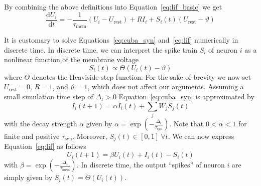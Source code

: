 \documentclass[journal,onecolumn,11pt]{IEEEtran}
\begin{document}
By combining the above definitions into Equation~\eqref{eq:lif_basic} we get 
\begin{equation} 
    \frac{\mathrm{d}U_i}{\mathrm{d}t} = -\frac{1}{\tau_\mathrm{mem}}(U_i-U_\mathrm{rest}) + RI_i + S_i(t)(U_\mathrm{rest}-\vartheta)
    \label{eq:lif}
\end{equation}

It is customary to solve Equations~\eqref{eq:cuba_syn} and~\eqref{eq:lif}
numerically in discrete time.  In discrete time, we can interpret the spike
train $S_i$ of neuron $i$ as a nonlinear function of the membrane voltage
\begin{equation}
    S_i(t)\propto\Theta(U_i(t)-\vartheta)
    \label{eq:spike}
\end{equation}
where $\Theta$ denotes the Heaviside step function.  For the sake of brevity we
now set $U_\mathrm{rest}=0$, $R=1$, and $\vartheta=1$, which does not affect our
arguments.  Assuming a small simulation time step of $\Delta_t>0$
Equation~\eqref{eq:cuba_syn} is approximated by
\begin{equation}
    I_i(t+1) = \alpha I_i(t) + \sum_j W_j S_j(t)
    \label{eq:syn_discrete_time}
\end{equation}
with the decay strength $\alpha$ given by
$\alpha=\exp\left(-\frac{\Delta_t}{\tau_\mathrm{syn}} \right)$.  Note that
$0<\alpha<1$ for finite and positive $\tau_\mathrm{syn}$.  Moreover, $S_j(t) \in
[0,1]~ \forall t$.  We can now express Equation~\eqref{eq:lif} as follows 
\begin{equation}
    U_i(t+1) = \beta U_i(t) + I_i(t) -S_i(t)
    \label{eq:mem_discrete_time}
\end{equation}
with $\beta=\exp\left(-\frac{\Delta_t}{\tau_\mathrm{mem}}\right)$.
In discrete time, the output ``spikes'' of neuron $i$ are simply given by $S_i(t)=\Theta(U_i(t))$.
\end{document}
